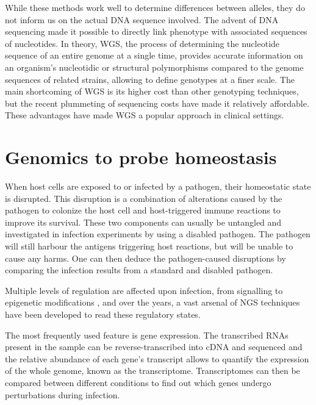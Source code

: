 While these methods work well to determine differences between alleles, they do not inform us on the actual DNA sequence involved. The advent of DNA sequencing made it possible to directly link phenotype with associated sequences of nucleotides. In theory, \acrfull{WGS}, the process of determining the nucleotide sequence of an entire genome at a single time, provides accurate information on an organism's nucleotidic or structural polymorphisms compared to the genome sequences of related strains, allowing to define genotypes at a finer scale. The main shortcoming of \acrshort{WGS} is its higher cost than other genotyping techniques, but the recent plummeting of sequencing costs have made it relatively affordable. These advantages have made \acrshort{WGS} a popular approach in clinical settings.

\section{Genomics to probe homeostasis}

When host cells are exposed to or infected by a pathogen, their homeostatic state is disrupted. This disruption is a combination of alterations caused by the pathogen to colonize the host cell and host-triggered immune reactions to improve its survival. These two components can usually be untangled and investigated in infection experiments by using a disabled pathogen. The pathogen will still harbour the antigens triggering host reactions, but will be unable to cause any harms. One can then deduce the pathogen-caused disruptions by comparing the infection results from a standard and disabled pathogen. 


Multiple levels of regulation are affected upon infection, from signalling to epigenetic modifications \cite{rolandoLegionellaPneumophilaType2014}, and over the years, a vast arsenal of NGS techniques have been developed to read these regulatory states. 

The most frequently used feature is gene expression. The transcribed RNAs present in the sample can be reverse-transcribed into cDNA and sequenced and the relative abundance of each gene's transcript allows to quantify the expression of the whole genome, known as the transcriptome. Transcriptomes can then be compared between different conditions to find out which genes undergo perturbations during infection. 

